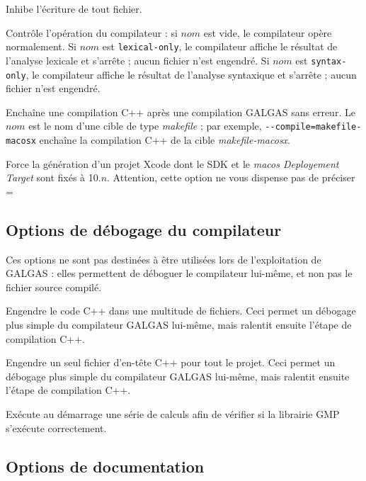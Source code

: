 { Inhibe l'écriture de tout fichier.


 Contrôle l'opération du compilateur : si $nom$ est vide, le compilateur opère normalement. Si $nom$ est \texttt{lexical-only}, le compilateur affiche le résultat de l'analyse lexicale et s'arrête ; aucun fichier n'est engendré. Si $nom$ est \texttt{syntax-only}, le compilateur affiche le résultat de l'analyse syntaxique et s'arrête ; aucun fichier n'est engendré.





 Enchaîne une compilation C++ après une compilation GALGAS sans erreur. Le $nom$ est le nom d'une cible de type \emph{makefile} ; par exemple, \texttt{-{-}compile=makefile-macosx} enchaîne la compilation C++ de la cible \emph{makefile-macosx}.


 Force la génération d'un projet Xcode dont le SDK et le \emph{macos Deployement Target} sont fixés à 10.$n$.  Attention, cette option ne vous dispense pas de préciser \ggst=%




\subsection{Options de débogage du compilateur}

Ces options ne sont pas destinées à être utilisées lors de l'exploitation de GALGAS : elles permettent de déboguer le compilateur lui-même, et non pas le fichier source compilé.



 Engendre le code C++ dans une multitude de fichiers. Ceci permet un débogage plus simple du compilateur GALGAS lui-même, mais ralentit ensuite l'étape de compilation C++.


 Engendre un seul fichier d'en-tête C++ pour tout le projet. Ceci permet un débogage plus simple du compilateur GALGAS lui-même, mais ralentit ensuite l'étape de compilation C++.


 Exécute au démarrage une série de calculs afin de vérifier si la librairie GMP s'exécute correctement.





\subsection{Options de documentation}

}
